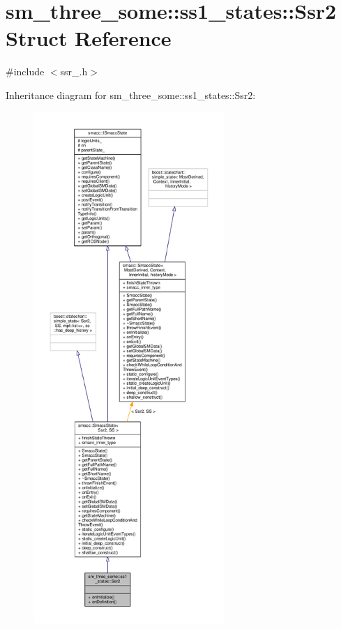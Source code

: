\hypertarget{structsm__three__some_1_1ss1__states_1_1Ssr2}{}\section{sm\+\_\+three\+\_\+some\+:\+:ss1\+\_\+states\+:\+:Ssr2 Struct Reference}
\label{structsm__three__some_1_1ss1__states_1_1Ssr2}


{\ttfamily \#include $<$ssr\+\_.\+h$>$}



Inheritance diagram for sm\+\_\+three\+\_\+some\+:\+:ss1\+\_\+states\+:\+:Ssr2\+:\nopagebreak
\begin{figure}[H]
\begin{center}
\leavevmode
\includegraphics[height=550pt]{structsm__three__some_1_1ss1__states_1_1Ssr2__inherit__graph}
\end{center}
\end{figure}


